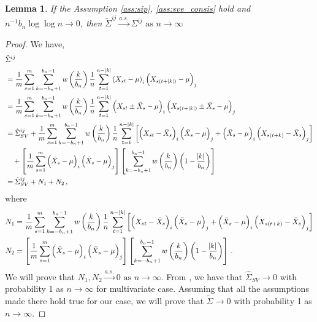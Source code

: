 \documentclass[11pt]{article}
\newtheorem{lemma}{Lemma}
\theoremstyle{remark}
\begin{document}
\begin{lemma} \label{lemma:pseudo_consis}
If the Assumption \ref{ass:sip}, \ref{ass:sve_consis} hold and $n^{-1}{b_n \log \log n}\to 0$, then $\tilde{\Sigma}^{ij} \xrightarrow{a.s.} \Sigma^{ij} \textrm{ as } n \to \infty$
\end{lemma}

\begin{proof}
We have,
\begin{align*}
    &\tilde{\Sigma}^{ij} \\
    & = \dfrac{1}{m}\sum_{s=1}^{m}\sum_{k=-b_n+1}^{b_n-1}w\left(\dfrac{k}{b_n}\right)\dfrac{1}{n}\sum_{t=1}^{n-|k|}  \left(X_{st} - \mu \right)_i  \left(X_{s(t+|k|)} - \mu \right)_j\\
    & = \dfrac{1}{m}\sum_{s=1}^{m}\sum_{k=-b_n+1}^{b_n-1}w\left(\dfrac{k}{b_n}\right)\dfrac{1}{n}\sum_{t=1}^{n-|k|}  \left(X_{st} \pm \bar{X}_s - \mu \right)_i  \left(X_{s(t+|k|)} \pm \bar{X}_s - \mu \right)_j\\
    & = \hat{\Sigma}_{SV}^{ij} + \dfrac{1}{m}\sum_{s=1}^{m}\sum_{k=-b_n+1}^{b_n-1}w\left(\dfrac{k}{b_n}\right)\dfrac{1}{n}\sum_{t=1}^{n-|k|}\left[ \left(X_{st} - \bar{X}_s \right)_i   \left(\bar{X}_s - \mu \right)_j + \left(\bar{X}_s - \mu \right)_i  \left(X_{s(t+k)} - \bar{X}_s \right)_j\right]\\
    & \quad + \left[\dfrac{1}{m}  \sum_{s=1}^{m}  \left(\bar{X}_s - \mu \right)_i  \left(\bar{X}_s - \mu \right)_j \right]  \left[\sum_{k=-b_n+1}^{b_n-1}w\left(\dfrac{k}{b_n}\right)\left(1 - \dfrac{\abs{k}}{b_n}\right) \right]\\
    & = \hat{\Sigma}_{SV}^{ij} + N_1 + N_2 \,,
\end{align*}
where
\begin{align*}
N_1 & = \dfrac{1}{m}\sum_{s=1}^{m}  \sum_{k=-b_n+1}^{b_n-1}  w\left(\dfrac{k}{b_n}\right)\dfrac{1}{n}  \sum_{t=1}^{n-|k|}  \left[ \left(X_{st} - \bar{X}_s \right)_i  \left(\bar{X}_s - \mu \right)_j + \left(\bar{X}_s - \mu \right)_i  \left(X_{s(t+k)} - \bar{X}_s \right)_j\right]\\
N_2 & = \left[\dfrac{1}{m}  \sum_{s=1}^{m}  \left(\bar{X}_s - \mu \right)_i  \left(\bar{X}_s - \mu \right)_j \right]  \left[\sum_{k=-b_n+1}^{b_n-1}w\left(\dfrac{k}{b_n}\right)\left(1 - \dfrac{\abs{k}}{b_n}\right) \right]\,.
\end{align*}
We will prove that $N_1, N_2\xrightarrow{a.s.} 0 \textrm{ as } n \to \infty$. From \cite{vats:fleg:jon:2018}, we have that $\hat{\Sigma}_{SV} \to 0$ with probability 1 as $n \to \infty$ for multivariate case. Assuming that all the assumptions made there hold true for our case, we will prove that $\tilde{\Sigma} \to 0$ with probability 1 as $n \to \infty$. 


\end{proof}
\end{document}
